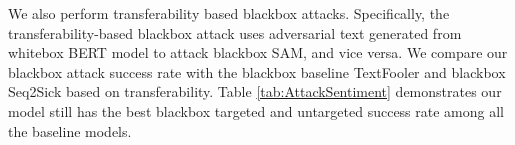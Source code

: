 We also perform transferability based blackbox attacks. Specifically, the transferability-based blackbox attack uses adversarial text generated from whitebox BERT model to attack blackbox SAM, and vice versa. We compare our blackbox attack success rate with the blackbox baseline TextFooler and blackbox Seq2Sick based on transferability. Table \ref{tab:AttackSentiment} demonstrates our \advcodecword model still has the best blackbox targeted and untargeted success rate among all the baseline models.





